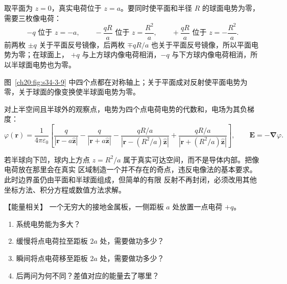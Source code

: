 {\begin{xesolution}
取平面为 $z=0$，真实电荷位于 $z=a$。要同时使平面和半径 $R$ 的球面电势为零，需要三枚像电荷：
\[
  -q\text{ 位于 }z=-a,\qquad
  -\frac{qR}{a}\text{ 位于 }z=\frac{R^2}{a},\qquad
  +\frac{qR}{a}\text{ 位于 }z=-\frac{R^2}{a}.
\]
前两枚 $\pm q$ 关于平面反号镜像，后两枚 $\mp qR/a$ 也关于平面反号镜像，所以平面电势为零；在球面上，
$+q$ 与上方球内像电荷相消，$-q$ 与下方球内像电荷相消，所以半球面电势也为零。

图~\ref{ch20:fig:s34-3-9} 中四个点都在对称轴上；关于平面成对反射使平面电势为零，关于球面的像变换使半球面电势为零。

\par\noindent\begin{minipage}{\linewidth}
\hemisphereImagesFigure
{}\label{ch20:fig:s34-3-9}
\end{minipage}\par\medskip

对上半空间且半球外的观察点，电势为四个点电荷电势的代数和，电场为其负梯度：
\[
  \boxed{\varphi(\boldsymbol r)=\frac1{4\pi\varepsilon_0}
  \left[
  \frac q{|\boldsymbol r-a\hat{\boldsymbol z}|}
  -\frac q{|\boldsymbol r+a\hat{\boldsymbol z}|}
  -\frac{qR/a}{|\boldsymbol r-(R^2/a)\hat{\boldsymbol z}|}
  +\frac{qR/a}{|\boldsymbol r+(R^2/a)\hat{\boldsymbol z}|}
  \right]},
  \qquad \boldsymbol E=-\boldsymbol\nabla\varphi.
\]

若半球向下凹，球内上方点 $z=R^2/a$ 属于真实可达空间，而不是导体内部。把像电荷放在那里会在真实
区域制造一个并不存在的奇点，违反电像法的基本要求。此时边界虽仍由平面和半球面组成，但简单的有限
反射不再封闭，必须改用其他坐标方法、积分方程或数值方法求解。
\end{xesolution}



\begin{origexamplebox}{【能量相关】}\label{ch20:ex:s34-3-9}
一个无穷大的接地金属板，一侧距板 $a$ 处放置一点电荷 $+q$。
\begin{enumerate}[label=(\arabic*)]
  \item 系统电势能为多大？
  \item 缓慢将点电荷拉至距板 $2a$ 处，需要做功多少？
  \item 瞬间将点电荷移至距板 $2a$ 处，需要做功多少？
  \item 后两问为何不同？差值对应的能量去了哪里？
\end{enumerate}

\ThQPlaneEnergy
\end{origexamplebox}\par\nopagebreak[4]

}
